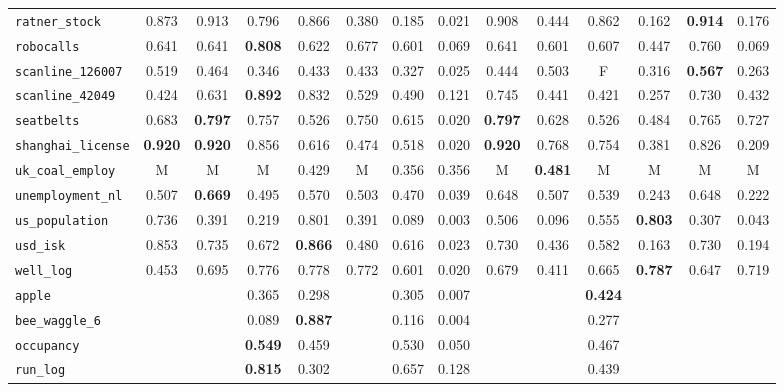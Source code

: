 \begin{tabular}{lccccccccccccc}
\verb+ratner_stock+ & 0.873 & 0.913 & 0.796 & 0.866 & 0.380 & 0.185 & 0.021 & 0.908 & 0.444 & 0.862 & 0.162 & \textbf{0.914} & 0.176\\
\verb+robocalls+ & 0.641 & 0.641 & \textbf{0.808} & 0.622 & 0.677 & 0.601 & 0.069 & 0.641 & 0.601 & 0.607 & 0.447 & 0.760 & 0.069\\
\verb+scanline_126007+ & 0.519 & 0.464 & 0.346 & 0.433 & 0.433 & 0.327 & 0.025 & 0.444 & 0.503 & F & 0.316 & \textbf{0.567} & 0.263\\
\verb+scanline_42049+ & 0.424 & 0.631 & \textbf{0.892} & 0.832 & 0.529 & 0.490 & 0.121 & 0.745 & 0.441 & 0.421 & 0.257 & 0.730 & 0.432\\
\verb+seatbelts+ & 0.683 & \textbf{0.797} & 0.757 & 0.526 & 0.750 & 0.615 & 0.020 & \textbf{0.797} & 0.628 & 0.526 & 0.484 & 0.765 & 0.727\\
\verb+shanghai_license+ & \textbf{0.920} & \textbf{0.920} & 0.856 & 0.616 & 0.474 & 0.518 & 0.020 & \textbf{0.920} & 0.768 & 0.754 & 0.381 & 0.826 & 0.209\\
\verb+uk_coal_employ+ & M & M & M & 0.429 & M & 0.356 & 0.356 & M & \textbf{0.481} & M & M & M & M\\
\verb+unemployment_nl+ & 0.507 & \textbf{0.669} & 0.495 & 0.570 & 0.503 & 0.470 & 0.039 & 0.648 & 0.507 & 0.539 & 0.243 & 0.648 & 0.222\\
\verb+us_population+ & 0.736 & 0.391 & 0.219 & 0.801 & 0.391 & 0.089 & 0.003 & 0.506 & 0.096 & 0.555 & \textbf{0.803} & 0.307 & 0.043\\
\verb+usd_isk+ & 0.853 & 0.735 & 0.672 & \textbf{0.866} & 0.480 & 0.616 & 0.023 & 0.730 & 0.436 & 0.582 & 0.163 & 0.730 & 0.194\\
\verb+well_log+ & 0.453 & 0.695 & 0.776 & 0.778 & 0.772 & 0.601 & 0.020 & 0.679 & 0.411 & 0.665 & \textbf{0.787} & 0.647 & 0.719\\
\hline
\verb+apple+ &  &  & 0.365 & 0.298 &  & 0.305 & 0.007 &  &  & \textbf{0.424} &  &  & \\
\verb+bee_waggle_6+ &  &  & 0.089 & \textbf{0.887} &  & 0.116 & 0.004 &  &  & 0.277 &  &  & \\
\verb+occupancy+ &  &  & \textbf{0.549} & 0.459 &  & 0.530 & 0.050 &  &  & 0.467 &  &  & \\
\verb+run_log+ &  &  & \textbf{0.815} & 0.302 &  & 0.657 & 0.128 &  &  & 0.439 &  &  & \\
\hline
\end{tabular}
